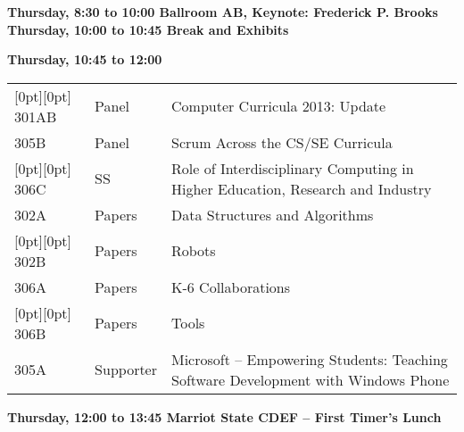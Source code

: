 
\noindent
{\sffamily\bfseries Thursday, 8:30 to 10:00 Ballroom AB, Keynote: Frederick P. Brooks}\newline\noindent
{\sffamily\bfseries Thursday, 10:00 to 10:45 Break and Exhibits}\newline\noindent

\noindent
{\sffamily\bfseries Thursday, 10:45 to 12:00}\newline\noindent
\begin{tabular*}{5in}{@{}p{0.5in}@{}p{0.75in}@{}p{3.75in}}

\rowcolor[gray]{0.9}[0pt][0pt] 301AB & Panel & Computer Curricula 2013:  Update \\

305B & Panel & Scrum Across the CS/SE Curricula \\

\rowcolor[gray]{0.9}[0pt][0pt] 306C & SS & Role of Interdisciplinary Computing in Higher Education, Research and Industry \\

302A & Papers & Data Structures and Algorithms \\

\rowcolor[gray]{0.9}[0pt][0pt] 302B & Papers & Robots \\

306A & Papers & K-6 Collaborations \\

\rowcolor[gray]{0.9}[0pt][0pt] 306B & Papers & Tools \\

305A & Supporter & Microsoft -- Empowering Students: Teaching Software Development with Windows Phone 
\end{tabular*}
{\sffamily\bfseries Thursday, 12:00 to 13:45  Marriot State CDEF -- First Timer's Lunch}\newline

